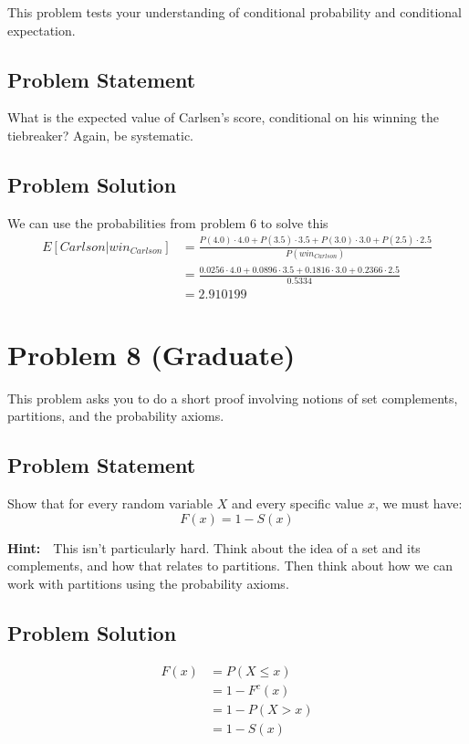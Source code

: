 \documentclass[12pt]{article}
\theoremstyle{definition}
\begin{document}
This problem tests your understanding of conditional probability and conditional expectation.

\subsection*{Problem Statement}

What is the expected value of Carlsen's score, conditional on his winning the tiebreaker? Again, be systematic.

\subsection*{Problem Solution}
We can use the probabilities from problem 6 to solve this
\begin{align*}
E[Carlson|win_{Carlson}] &= \frac{P(4.0)\cdot 4.0 + P(3.5) \cdot 3.5 + P(3.0) \cdot 3.0 + P(2.5) \cdot 2.5}{P(win_{Carlson})}\\
&= \frac{0.0256 \cdot 4.0 + 0.0896 \cdot 3.5 + 0.1816 \cdot 3.0 + 0.2366 \cdot 2.5}{0.5334}\\
&= 2.910199
\end{align*}



\newpage
\section*{Problem 8 (Graduate)}

This problem asks you to do a short proof involving notions of set complements, partitions, and the probability axioms.

\subsection*{Problem Statement}

Show that for every random variable $X$ and every specific value $x$, we must have:
$$
F(x) = 1 - S(x)
$$

\bigskip
\noindent
{\bf Hint:}\ \ This isn't particularly hard. Think about the idea of a set and its complements, and how that relates to partitions. Then think about how we can work with partitions using the probability axioms.



\subsection*{Problem Solution}
\begin{align*}
F(x) &= P(X \leq x)\\
&= 1 - F^c(x) \\
&= 1 - P(X > x)\\
&= 1 - S(x)\\
\end{align*}
\end{document}
